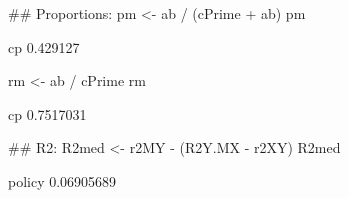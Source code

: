 \begin{Schunk}
\begin{Sinput}
 ## Proportions:
 pm <- ab / (cPrime + ab)
 pm
\end{Sinput}
\begin{Soutput}
      cp 
0.429127 
\end{Soutput}
\begin{Sinput}
 rm <- ab / cPrime
 rm
\end{Sinput}
\begin{Soutput}
       cp 
0.7517031 
\end{Soutput}
\begin{Sinput}
 ## R2:
 R2med <- r2MY - (R2Y.MX - r2XY)
 R2med
\end{Sinput}
\begin{Soutput}
    policy 
0.06905689 
\end{Soutput}
\end{Schunk}
